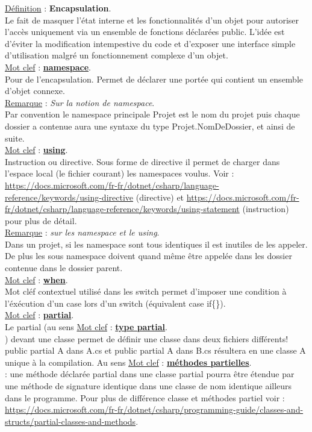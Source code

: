 \documentclass[a4paper,12pt,twoside]{article}
\newcommand{\urlcolor}{magenta}  %
\newcommand{\keycolor}{purple} %
\newcommand{\incode}[1]{{\footnotesize\ttfamily #1}} %
\newcommand{\rem}[2]{\noindent\underline{Remarque} : \textit{#1}.\\ \indent #2}
\newcommand{\defi}[2]{\noindent\underline{Définition} : \textbf{#1}.\\ \indent #2}
\newcommand{\keyref}[2]{\hypersetup{urlcolor=\keycolor} \href{#1}{\textbf{#2}}\hypersetup{urlcolor=\urlcolor}}
\newcommand{\keyword}[3]{\noindent\underline{Mot clef} : \keyref{#1}{#2}. \\ \indent #3}
\begin{document}
\defi{Encapsulation}{Le fait de masquer l'état interne et les fonctionnalités d'un objet pour autoriser l'accès uniquement via un ensemble de fonctions déclarées \incode{public}. L'idée est d'éviter la modification intempestive du code et d'exposer une interface simple d'utilisation malgré un fonctionnement complexe d'un objet.}\\

\keyword{https://docs.microsoft.com/fr-fr/dotnet/csharp/language-reference/keywords/namespace}{namespace}{Pour de l'encapsulation. Permet de déclarer une portée qui contient un ensemble d'objet connexe.}\\

\rem{Sur la notion de \incode{namespace}}{Par convention le namespace principale \incode{Projet} est le nom du projet puis chaque dossier a contenue aura une syntaxe du type \incode{Projet.NomDeDossier}, et ainsi de suite.}\\

\keyword{https://docs.microsoft.com/fr-fr/dotnet/csharp/language-reference/keywords/using}{using}{Instruction ou directive. Sous forme de directive il permet de charger dans l'espace local (le fichier courant) les namespaces voulus. Voir : \url{https://docs.microsoft.com/fr-fr/dotnet/csharp/language-reference/keywords/using-directive} (directive) et \url{https://docs.microsoft.com/fr-fr/dotnet/csharp/language-reference/keywords/using-statement} (instruction) pour plus de détail.}\\

\rem{sur les namespace et le using}{Dans un projet, si les namespace sont tous identiques il est inutiles de les appeler. De plus les sous namespace doivent quand même être appelée dans les dossier contenue dans le dossier parent.}\\

\keyword{https://docs.microsoft.com/fr-fr/dotnet/csharp/language-reference/keywords/when}{when}{Mot cléf contextuel utilisé dans les \incode{switch} permet d'imposer une condition à l'éxécution d'un case lors d'un switch (équivalent case {\incode{if\{\}}}).}\\

\keyword{https://docs.microsoft.com/fr-fr/dotnet/csharp/programming-guide/classes-and-structs/partial-classes-and-methods}{partial}{Le \incode{partial} (au sens \keyword{https://docs.microsoft.com/fr-fr/dotnet/csharp/language-reference/keywords/partial-type}{type partial}) devant une classe permet de définir une classe dans deux fichiers différents! public partial A dans A.cs et public partial A dans B.cs résultera en une classe A unique à la compilation. Au sens \keyword{https://docs.microsoft.com/fr-fr/dotnet/csharp/language-reference/keywords/partial-method}{méthodes partielles}: une méthode déclarée \incode{partial} dans une classe \incode{partial} pourra être étendue par une méthode de signature identique dans une classe de nom identique ailleurs dans le programme. Pour plus de différence classe et méthodes partiel voir : \url{https://docs.microsoft.com/fr-fr/dotnet/csharp/programming-guide/classes-and-structs/partial-classes-and-methods}.}\\
\end{document}
